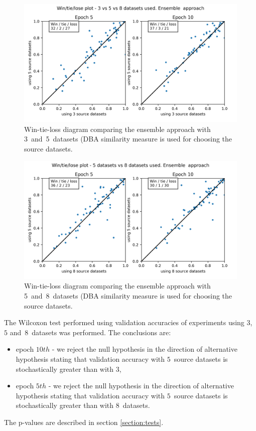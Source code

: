\documentclass[a4paper,11pt,twoside]{report}
\theoremstyle{definition}
\begin{document}
\FloatBarrier
\begin{figure}[h!t]
\centering
\includegraphics[width=17cm]{imgs/ensemble_dba_3_vs_5/win_tie_lose_epoch.png}
\caption{Win-tie-loss diagram comparing the ensemble approach with 3~and~5~datasets (DBA similarity measure is used for choosing the source datasets.}
\label{fig:ensemble_3_5_win_tie_loss}
\end{figure}
\FloatBarrier
\begin{figure}[h!t]
\centering
\includegraphics[width=17cm]{imgs/ensemble_dba_5_vs_8/win_tie_lose_epoch.png}
\caption{Win-tie-loss diagram comparing the ensemble approach with 5~and~8~datasets (DBA similarity measure is used for choosing the source datasets.}
\label{fig:ensemble_5_8_win_tie_loss}
\end{figure}
\FloatBarrier
The Wilcoxon test performed using validation accuracies of experiments using $3$,~$5$ and~$8$~datasets was performed. The conclusions are:
\begin{itemize}
\item epoch $10th$ -  we reject the null hypothesis in the direction of alternative hypothesis stating that validation accuracy with $5$~source datasets is stochastically greater than with $3$,
\item epoch $5th$ -  we reject the null hypothesis in the direction of alternative hypothesis stating that validation accuracy with $5$~source datasets is stochastically greater than with $8$~datasets.
\end{itemize}
The p-values are described in section \ref{section:tests}.
\end{document}
